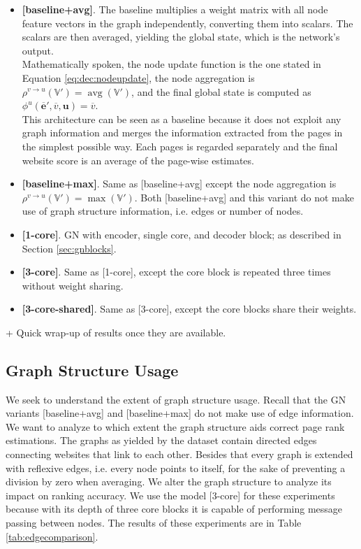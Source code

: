 \begin{itemize}
    \item \textbf{[baseline+avg]}. The baseline multiplies a weight matrix with all node feature vectors in the graph independently, converting them into scalars. The scalars are then averaged, yielding the global state, which is the network's output.\\
    Mathematically spoken, the node update function is the one stated in Equation \ref{eq:dec:nodeupdate}, the node aggregation is $\rho^{v\rightarrow u}\left(\mathbb{V}'\right)=\operatorname{avg}\left(\mathbb{V}'\right)$, and the final global state is computed as $\phi^u\left(\bm{\overline{e}}',\overline{v},\bm{u}\right)=\overline{v}$.\\
    This architecture can be seen as a baseline because it does not exploit any graph information and merges the information extracted from the pages in the simplest possible way. Each pages is regarded separately and the final website score is an average of the page-wise estimates.
    \item \textbf{[baseline+max]}. Same as [baseline+avg] except the node aggregation is $\rho^{v\rightarrow u}\left(\mathbb{V}'\right)=\operatorname{max}\left(\mathbb{V}'\right)$. Both [baseline+avg] and this variant do not make use of graph structure information, i.e. edges or number of nodes.
    \item \textbf{[1-core]}. GN with encoder, single core, and decoder block; as described in Section \ref{sec:gnblocks}.
    \item \textbf{[3-core]}. Same as [1-core], except the core block is repeated three times without weight sharing.
    \item \textbf{[3-core-shared]}. Same as [3-core], except the core blocks share their weights.
\end{itemize}

+ Quick wrap-up of results once they are available.

\subsection{Graph Structure Usage}

We seek to understand the extent of graph structure usage. Recall that the GN variants [baseline+avg] and [baseline+max] do not make use of edge information. We want to analyze to which extent the graph structure aids correct page rank estimations. The graphs as yielded by the dataset contain directed edges connecting websites that link to each other. Besides that every graph is extended with reflexive edges, i.e. every node points to itself, for the sake of preventing a division by zero when averaging. We alter the graph structure to analyze its impact on ranking accuracy. We use the model [3-core] for these experiments because with its depth of three core blocks it is capable of performing message passing between nodes. The results of these experiments are in Table \ref{tab:edgecomparison}.

